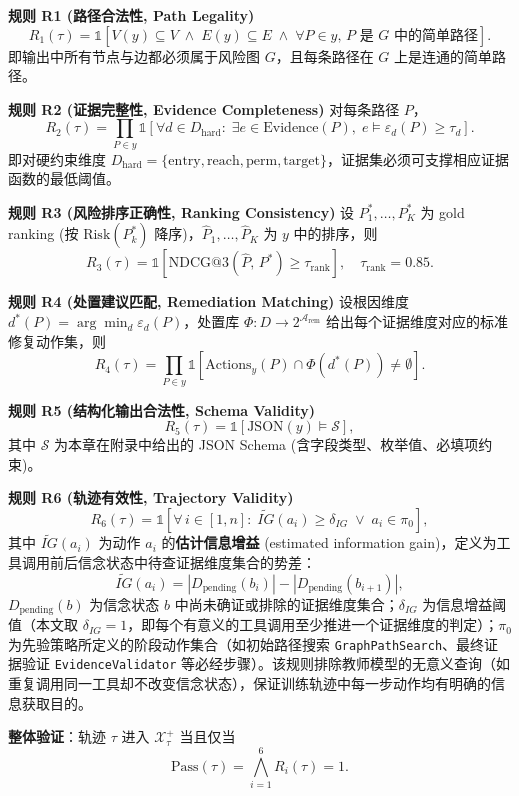 \documentclass[a4paper,12pt]{ctexart}
\begin{document}
\textbf{规则 R1 (路径合法性, Path Legality)}
\[R_1(\tau)=\mathbb{1}\!\left[V(y)\subseteq V \;\land\; E(y)\subseteq E \;\land\; \forall P\in y,\, P\text{ 是 }G\text{ 中的简单路径}\right].\]
即输出中所有节点与边都必须属于风险图 $G$，且每条路径在 $G$ 上是连通的简单路径。

\textbf{规则 R2 (证据完整性, Evidence Completeness)} 对每条路径 $P$，
\[R_2(\tau)=\prod_{P\in y}\mathbb{1}\!\left[\forall d\in D_{\mathrm{hard}}:\; \exists e\in\mathrm{Evidence}(P),\; e\models \varepsilon_d(P)\geq \tau_d\right].\]
即对硬约束维度 $D_{\mathrm{hard}}=\{\mathrm{entry},\mathrm{reach},\mathrm{perm},\mathrm{target}\}$，证据集必须可支撑相应证据函数的最低阈值。

\textbf{规则 R3 (风险排序正确性, Ranking Consistency)} 设 $P^*_1,\ldots,P^*_K$ 为 gold ranking (按 $\mathrm{Risk}(P^*_k)$ 降序)，$\hat P_1,\ldots,\hat P_K$ 为 $y$ 中的排序，则
\[R_3(\tau)=\mathbb{1}\!\left[\mathrm{NDCG@3}(\hat P,\, P^*)\geq \tau_{\mathrm{rank}}\right],\quad \tau_{\mathrm{rank}}=0.85.\]

\textbf{规则 R4 (处置建议匹配, Remediation Matching)} 设根因维度 $d^*(P)=\arg\min_d \varepsilon_d(P)$，处置库 $\Phi:D\to 2^{\mathcal{A}_{\mathrm{rem}}}$ 给出每个证据维度对应的标准修复动作集，则
\[R_4(\tau)=\prod_{P\in y}\mathbb{1}\!\left[\mathrm{Actions}_y(P)\cap \Phi(d^*(P))\neq \emptyset\right].\]

\textbf{规则 R5 (结构化输出合法性, Schema Validity)}
\[R_5(\tau)=\mathbb{1}\!\left[\mathrm{JSON}(y)\models \mathcal{S}\right],\]
其中 $\mathcal{S}$ 为本章在附录中给出的 JSON Schema (含字段类型、枚举值、必填项约束)。

\textbf{规则 R6 (轨迹有效性, Trajectory Validity)}
\[R_6(\tau)=\mathbb{1}\!\left[\forall\, i\in[1,n]:\; \widetilde{IG}(a_i)\geq \delta_{IG}\;\lor\; a_i\in \pi_0\right],\]
其中 $\widetilde{IG}(a_i)$ 为动作 $a_i$ 的\textbf{估计信息增益} (estimated information gain)，定义为工具调用前后信念状态中待查证据维度集合的势差：
\[\widetilde{IG}(a_i) = |D_{\mathrm{pending}}(b_i)| - |D_{\mathrm{pending}}(b_{i+1})|,\]
$D_{\mathrm{pending}}(b)$ 为信念状态 $b$ 中尚未确证或排除的证据维度集合；$\delta_{IG}$ 为信息增益阈值（本文取 $\delta_{IG}=1$，即每个有意义的工具调用至少推进一个证据维度的判定）；$\pi_0$ 为先验策略所定义的阶段动作集合（如初始路径搜索 \texttt{GraphPathSearch}、最终证据验证 \texttt{EvidenceValidator} 等必经步骤）。该规则排除教师模型的无意义查询（如重复调用同一工具却不改变信念状态），保证训练轨迹中每一步动作均有明确的信息获取目的。

\textbf{整体验证}：轨迹 $\tau$ 进入 $\mathcal{X}_\tau^+$ 当且仅当
\[\mathrm{Pass}(\tau)=\bigwedge_{i=1}^{6} R_i(\tau)=1.\]
\end{document}
